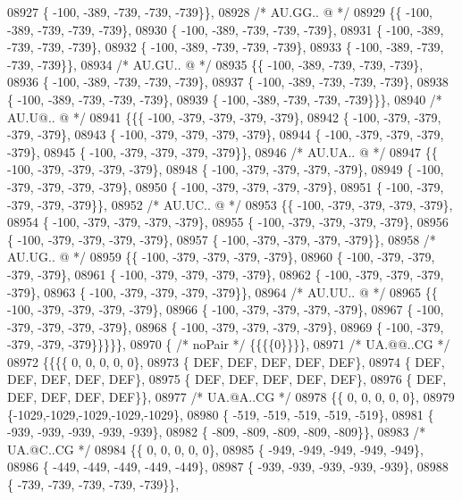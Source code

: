 \begin{DoxyCode}
08927 \{ -100, -389, -739, -739, -739\}\},
08928 \textcolor{comment}{/* AU.GG.. @ */}
08929 \{\{ -100, -389, -739, -739, -739\},
08930 \{ -100, -389, -739, -739, -739\},
08931 \{ -100, -389, -739, -739, -739\},
08932 \{ -100, -389, -739, -739, -739\},
08933 \{ -100, -389, -739, -739, -739\}\},
08934 \textcolor{comment}{/* AU.GU.. @ */}
08935 \{\{ -100, -389, -739, -739, -739\},
08936 \{ -100, -389, -739, -739, -739\},
08937 \{ -100, -389, -739, -739, -739\},
08938 \{ -100, -389, -739, -739, -739\},
08939 \{ -100, -389, -739, -739, -739\}\}\},
08940 \textcolor{comment}{/* AU.U@.. @ */}
08941 \{\{\{ -100, -379, -379, -379, -379\},
08942 \{ -100, -379, -379, -379, -379\},
08943 \{ -100, -379, -379, -379, -379\},
08944 \{ -100, -379, -379, -379, -379\},
08945 \{ -100, -379, -379, -379, -379\}\},
08946 \textcolor{comment}{/* AU.UA.. @ */}
08947 \{\{ -100, -379, -379, -379, -379\},
08948 \{ -100, -379, -379, -379, -379\},
08949 \{ -100, -379, -379, -379, -379\},
08950 \{ -100, -379, -379, -379, -379\},
08951 \{ -100, -379, -379, -379, -379\}\},
08952 \textcolor{comment}{/* AU.UC.. @ */}
08953 \{\{ -100, -379, -379, -379, -379\},
08954 \{ -100, -379, -379, -379, -379\},
08955 \{ -100, -379, -379, -379, -379\},
08956 \{ -100, -379, -379, -379, -379\},
08957 \{ -100, -379, -379, -379, -379\}\},
08958 \textcolor{comment}{/* AU.UG.. @ */}
08959 \{\{ -100, -379, -379, -379, -379\},
08960 \{ -100, -379, -379, -379, -379\},
08961 \{ -100, -379, -379, -379, -379\},
08962 \{ -100, -379, -379, -379, -379\},
08963 \{ -100, -379, -379, -379, -379\}\},
08964 \textcolor{comment}{/* AU.UU.. @ */}
08965 \{\{ -100, -379, -379, -379, -379\},
08966 \{ -100, -379, -379, -379, -379\},
08967 \{ -100, -379, -379, -379, -379\},
08968 \{ -100, -379, -379, -379, -379\},
08969 \{ -100, -379, -379, -379, -379\}\}\}\}\},
08970 \{ \textcolor{comment}{/* noPair */} \{\{\{\{0\}\}\}\},
08971 \textcolor{comment}{/* UA.@@..CG */}
08972 \{\{\{\{    0,    0,    0,    0,    0\},
08973 \{  DEF,  DEF,  DEF,  DEF,  DEF\},
08974 \{  DEF,  DEF,  DEF,  DEF,  DEF\},
08975 \{  DEF,  DEF,  DEF,  DEF,  DEF\},
08976 \{  DEF,  DEF,  DEF,  DEF,  DEF\}\},
08977 \textcolor{comment}{/* UA.@A..CG */}
08978 \{\{    0,    0,    0,    0,    0\},
08979 \{-1029,-1029,-1029,-1029,-1029\},
08980 \{ -519, -519, -519, -519, -519\},
08981 \{ -939, -939, -939, -939, -939\},
08982 \{ -809, -809, -809, -809, -809\}\},
08983 \textcolor{comment}{/* UA.@C..CG */}
08984 \{\{    0,    0,    0,    0,    0\},
08985 \{ -949, -949, -949, -949, -949\},
08986 \{ -449, -449, -449, -449, -449\},
08987 \{ -939, -939, -939, -939, -939\},
08988 \{ -739, -739, -739, -739, -739\}\},

\end{DoxyCode}
